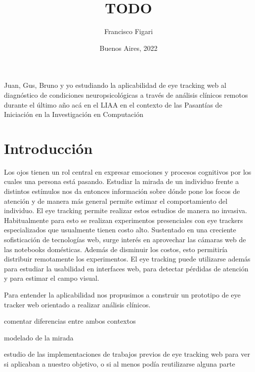 \documentclass{beamer}
\title{TODO}
\author{Francisco Figari}
\date{Buenos Aires, 2022}
\begin{document}
\frame{\titlepage}

Juan, Gus, Bruno y yo
estudiando
  la aplicabilidad de eye tracking web
  al diagnóstico de condiciones neuropsicológicas
  a través de análisis clínicos remotos
durante el último año
acá
  en el LIAA
  en el contexto de las Pasantías de Iniciación en la Investigación en Computación


\section{Introducción}



Los ojos tienen un rol central en expresar emociones y procesos cognitivos por
los cuales una persona está pasando.
Estudiar la mirada de un individuo frente a distintos estímulos nos da entonces
información sobre dónde pone los focos de atención y de manera más general
permite estimar el comportamiento del individuo.
El eye tracking permite realizar estos estudios de manera no invasiva.
Habitualmente para esto se realizan experimentos presenciales con eye trackers
especializados que usualmente tienen costo alto.
Sustentado en una creciente sofisticación de tecnologías web,
surge interés en aprovechar las cámaras web de las notebooks domésticas.
Además de disminuir los costos, esto permitiría distribuir remotamente los
experimentos.
El eye tracking puede utilizarse además para estudiar la usabilidad en
interfaces web, para detectar pérdidas de atención y para estimar el campo
visual.

Para entender la aplicabilidad nos propusimos a construir un prototipo de eye
tracker web orientado a realizar análisis clínicos.

comentar diferencias entre ambos contextos

modelado de la mirada

estudio de las implementaciones de trabajos previos de eye tracking web para
ver si aplicaban a nuestro objetivo, o si al menos podía reutilizarse alguna 
parte
\end{document}
